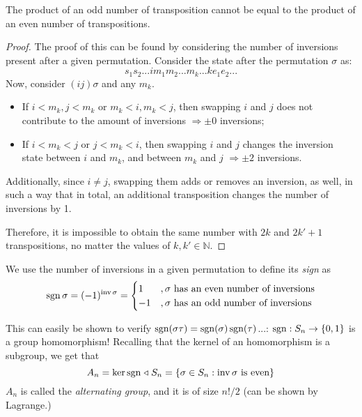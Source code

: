 \begin{theorem}
  The product of an odd number of transposition cannot be equal to the product of an even number of transpositions.
\end{theorem}
\begin{proof}
  The proof of this can be found by considering the number of inversions present after a given permutation. Consider the state after the permutation $\sigma$ as: 
  \[
    s_1s_2...im_1m_2...m_k...ke_1e_2...
  \]
  Now, consider $(ij)\sigma$ and any $m_k$. 
  \begin{itemize}
    \item If $i < m_k, j < m_k$ or $m_k < i, m_k < j$, then swapping $i$ and $j$ does not contribute to the amount of inversions $\Rightarrow \pm 0$ inversions; 
    \item If $i < m_k < j$ or $j < m_k < i$, then swapping $i$ and $j$ changes the inversion state between $i$ and $m_k$, and between $m_k$ and $j$ $\Rightarrow \pm 2$ inversions.
  \end{itemize}
  Additionally, since $i \neq j$, swapping them adds or removes an inversion, as well, in such a way that in total, an additional transposition changes the number of inversions by 1. 

  Therefore, it is impossible to obtain the same number with $2k$ and $2k' + 1$ transpositions, no matter the values of $k, k' \in \mathbb{N}$. 
\end{proof}
\begin{definition}
  We use the number of inversions in a given permutation to define its \emph{sign} as 
  \[
    \operatorname{sgn}{\sigma} = (-1)^{\operatorname{inv}\sigma} = \begin{cases}
      1 &, \sigma \text{ has an even number of inversions} \\
      -1 &, \sigma \text{ has an odd number of inversions}
    \end{cases}
  \]
\end{definition}

This can easily be shown to verify $\operatorname{sgn}(\sigma\tau) = \operatorname{sgn}(\sigma)\operatorname{sgn}(\tau)$...: $\operatorname{sgn}: S_n \to \{0, 1\}$ is a group homomorphism! Recalling that the kernel of an homomorphism is a subgroup, we get that 
\[
  A_n = \ker\operatorname{sgn} \mathrel{\triangleleft} S_n = \{\sigma \in S_n : \operatorname{inv}\sigma \text{ is even}\}
\]
$A_n$ is called the \emph{alternating group}, and it is of size $n! / 2$ (can be shown by Lagrange.)

\begin{theorem*}
  
\end{theorem*}